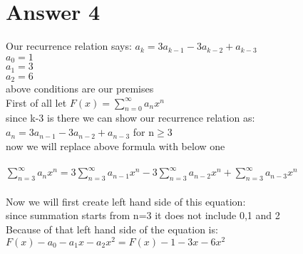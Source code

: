 \documentclass[11pt]{article}
\begin{document}
\section*{Answer 4}
 Our recurrence relation says: $a_{k} = 3a_{k-1} -3a_{k-2} +a_{k-3}$\\
$a_0=1$\\
$a_1=3$\\
$a_2=6$\\
above conditions are our premises\\
First of all let $F(x)=\sum_{n=0}^{\infty}a_{n}x^{n}$\\
since k-3 is there we can show our recurrence relation as:
$a_{n} = 3a_{n-1} -3a_{n-2} +a_{n-3}$ for n$\geq$3\\
now we will replace above formula with below one\\
\\
$\sum_{n=3}^{\infty}a_{n}x^{n}=3\sum_{n=3}^{\infty}a_{n-1}x^{n}-3\sum_{n=3}^{\infty}a_{n-2}x^{n}+\sum_{n=3}^{\infty}a_{n-3}x^{n}$\\
\\

Now we will first create left hand side of this equation:\\
since summation starts from n=3 it does not include 0,1 and 2\\
Because of that left hand side of the equation is:\\
$F(x)-a_{0}-a_{1}x-a_{2}x^{2}=F(x)-1-3x-6x^{2}$\\
\end{document}
